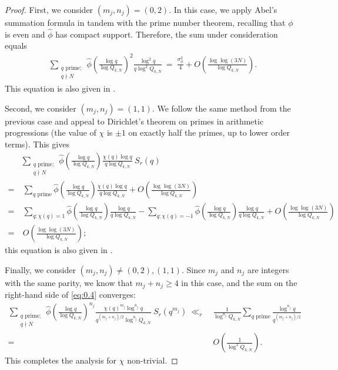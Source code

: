 \documentclass[12pt, reqno,oneside]{amsart}
\theoremstyle{plain}
\theoremstyle{definition}
\theoremstyle{remark}
\theoremstyle{plain}
\numberwithin{equation}{section}
\begin{document}
\begin{proof}
First, we consider $(m_j,n_j)=(0,2)$. In this case, we apply Abel's summation formula in tandem with the prime number theorem, recalling that $\phi$ is even and $\widehat{\phi}$ has compact support. Therefore, the sum under consideration equals
\begin{align}
\sum_{\substack{q\text{ prime}; \\ q\nmid N}}\widehat{\phi}\left(\frac{\log q}{\log Q_{k,N}}\right)^2\frac{\log^2q}{q\log^2Q_{k,N}} \ = \ \frac{\sigma_\phi^2}{4}+O\left(\frac{\log\log(3N)}{\log Q_{k,N}}\right).
\end{align}
This equation is also given in \cite[(3.4)]{HM07}. 

Second, we consider $(m_j,n_j)=(1,1)$. We follow the same method from the previous case and appeal to Dirichlet's theorem on primes in arithmetic progressions (the value of $\chi$ is $\pm1$ on exactly half the primes, up to lower order terms). This gives
\begin{align}
\nonumber
&\sum_{\substack{q\text{ prime}; \\ q\nmid N}}\widehat{\phi}\left(\frac{\log q}{\log Q_{k,N}}\right)\frac{\chi(q)\log q}{q\log Q_{k,N}} \ S_r(q) \\
\nonumber
= & \ \sum_{q\text{ prime}}\widehat{\phi}\left(\frac{\log q}{\log Q_{k,N}}\right)\frac{\chi(q)\log q}{q\log Q_{k,N}}+O\left(\frac{\log\log(3N)}{\log Q_{k,N}}\right) \\
\nonumber
= & \ \sum_{q:\chi(q)=1}\widehat{\phi}\left(\frac{\log q}{\log Q_{k,N}}\right)\frac{\log q}{q\log Q_{k,N}}-\sum_{q:\chi(q)=-1}\widehat{\phi}\left(\frac{\log q}{\log Q_{k,N}}\right)\frac{\log q}{q\log Q_{k,N}}+O\left(\frac{\log\log(3N)}{\log Q_{k,N}}\right) \\
= & \ O\left(\frac{\log\log(3N)}{\log Q_{k,N}}\right);
\end{align}
this equation is also given in \cite[165]{KR18}.

Finally, we consider $(m_j,n_j)\neq(0,2),(1,1)$. Since $m_j$ and $n_j$ are integers with the same parity, we know that $m_j+n_j\geq4$ in this case, and the sum on the right-hand side of \eqref{eq:0.4} converges: 
\begin{align}\label{eq:0.4}
\nonumber
\sum_{\substack{q\text{ prime}; \\ q\nmid N}}\widehat{\phi}\left(\frac{\log q}{\log Q_{k,N}}\right)^{n_j}\frac{\chi(q)^{m_j}\log^{n_j} q}{q^{(m_j+n_j)/2}\log^{n_j} Q_{k,N}} \ S_r\left(q^{m_j}\right) \ \ll_r & \ \frac{1}{\log^{n_j} Q_{k,N}}\sum_{q\text{ prime}}\frac{\log^{n_j} q}{q^{(m_j+n_j)/2}}\\
= & \ O\left(\frac{1}{\log^2 Q_{k,N}}\right).
\end{align}
This completes the analysis for $\chi$ non-trivial. 
\end{proof}
\end{document}

